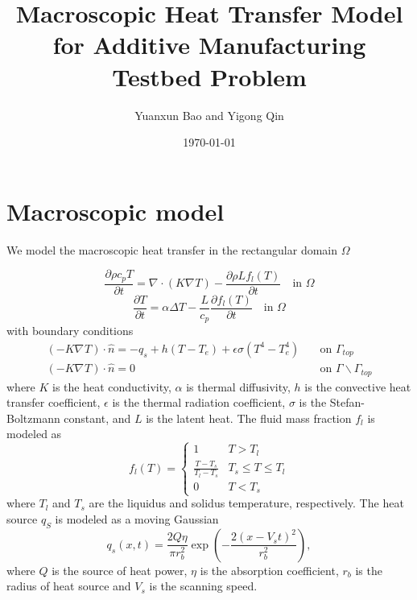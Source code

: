 \documentclass[a4paper,12pt]{article}
\title{Macroscopic Heat Transfer Model for Additive Manufacturing Testbed Problem}
\author{Yuanxun Bao and Yigong Qin}
\date{\today}
\renewcommand{\div}[1]{\nabla_{#1} \cdot}
\newcommand{\grad}[1]{\nabla_{#1}}
\begin{document}
\maketitle


\section{Macroscopic model}

We model the macroscopic heat transfer in the rectangular domain $\Omega$

\begin{equation}
\frac{\partial \rho c_{p} T}{ \partial t} = \div{} ( K \grad{} T) -\frac{\partial \rho L  f_l(T)}{\partial t} \quad \text{in }  \Omega
\end{equation}
\begin{equation}
\frac{\partial T}{ \partial t} = \alpha \Delta T - \frac{L}{c_p}\frac{\partial   f_l(T)}{\partial t} \quad \text{in }  \Omega
\end{equation}
with boundary conditions 
\begin{align}
(-K \grad{} T) \cdot \hat{n} = -q_s + h(T - T_e) + \epsilon \sigma (T^4 - T_e^4)  & \quad \text{on } \Gamma_{top} \\
(-K \grad{} T) \cdot \hat{n} = 0  & \quad \text{on } \Gamma  \backslash \Gamma_{top}
\end{align}
where $K$ is the heat conductivity, $\alpha$ is thermal diffusivity, $h$ is the convective heat transfer coefficient, $\epsilon$ is the thermal radiation coefficient, $\sigma$ is the Stefan-Boltzmann constant, and $L$ is the latent heat. The fluid mass fraction $f_l$ is modeled as
\begin{equation}
f_l(T) =
\left\{
\begin{array}{cc}
1 & T>T_l \\
\frac{T-T_s}{T_l - T_s} & T_s \leq T \leq T_l \\
0 & T < T_s
\end{array}
\right.
\end{equation}
where $T_l$ and $T_s$ are the liquidus and solidus temperature, respectively.
The heat source $q_S$ is modeled as a moving Gaussian
\begin{equation}
q_s(x, t ) = \frac{2Q\eta}{\pi r_b^2} \exp \left( -\frac{ 2(x-V_s t)^2}{ r_b^2} \right),
\end{equation}
where $Q$ is the source of heat power, $\eta$ is the absorption coefficient, $r_b$ is the radius of heat source and $V_s$ is the scanning speed.  
\end{document}
